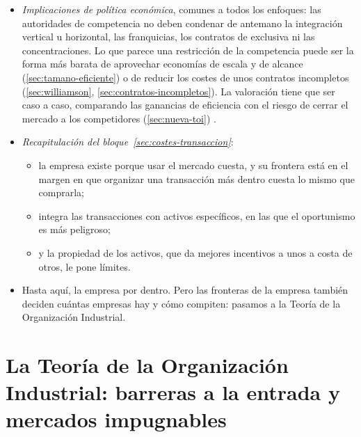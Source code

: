 \documentclass[11pt]{article}
\begin{document}
\begin{itemize}
\begin{itemize}
  \end{itemize}
\item \emph{Implicaciones de política económica}, comunes a todos los enfoques: las autoridades de competencia no deben condenar de antemano la integración vertical u horizontal, las franquicias, los contratos de exclusiva ni las concentraciones. Lo que parece una restricción de la competencia puede ser la forma más barata de aprovechar economías de escala y de alcance (\ref{sec:tamano-eficiente}) o de reducir los costes de unos contratos incompletos (\ref{sec:williamson}, \ref{sec:contratos-incompletos}). La valoración tiene que ser caso a caso, comparando las ganancias de eficiencia con el riesgo de cerrar el mercado a los competidores (\ref{sec:nueva-toi})  .
\end{itemize}

\begin{itemize}
\item \emph{Recapitulación del bloque~\ref{sec:costes-transaccion}}:
  \begin{itemize}
  \item la empresa existe porque usar el mercado cuesta, y su frontera está en el margen en que organizar una transacción más dentro cuesta lo mismo que comprarla\nocite{Coase1937Nature};
  \item integra las transacciones con activos específicos, en las que el oportunismo es más peligroso\nocite{Williamson1985Economic};
  \item y la propiedad de los activos, que da mejores incentivos a unos a costa de otros, le pone límites\nocite{GrossmanHart1986Costs}.
  \end{itemize}
\item Hasta aquí, la empresa por dentro. Pero las fronteras de la empresa también deciden cuántas empresas hay y cómo compiten: pasamos a la Teoría de la Organización Industrial.
\end{itemize}


\section{La Teoría de la Organización Industrial:\cortetitulo{} barreras a la entrada y mercados impugnables}\label{sec:toi}
\end{document}
